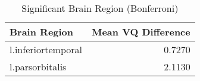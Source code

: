 \begin{table}
\caption{Significant Brain Region (Bonferroni)}
\label{tab:significant_VQ_bon}
\begin{tabular}{lr}
\toprule
Brain Region & Mean VQ Difference \\
\midrule
l.inferiortemporal & 0.7270 \\
l.parsorbitalis & 2.1130 \\
\bottomrule
\end{tabular}
\end{table}
